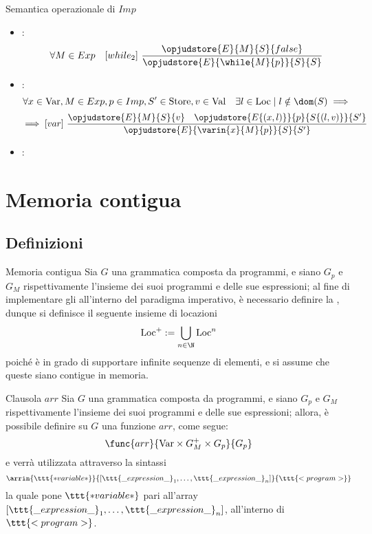 \documentclass[a4paper, 12pt]{report}
\begin{document}
\begin{framedprop}[label={imp sem},breakable]{Semantica operazionale di $Imp$}
\begin{itemize}
            \item {}:  $$\forall M \in Exp \quad [while_2] \ \dfrac{\opjudstore{E}{M}{S}{false}}{\opjudstore{E}{\while{M}{p}}{S}{S}}$$
            \item {}: $$\forall x \in \mathrm{Var}, M \in Exp, p \in Imp, S' \in \mathrm{Store}, v \in \mathrm{Val} \quad \exists l \in \mathrm{Loc} \mid l \notin \dom(S) \implies$$ $$\implies [var] \ \dfrac{\opjudstore{E}{M}{S}{v} \quad \opjudstore{E\{(x,l)\}}{p}{S\{(l,v)\}}{S'}}{\opjudstore{E}{\varin{x}{M}{p}}{S}{S'}}$$
            \item {}: 
        \end{itemize}
    \end{framedprop}

    \section{Memoria contigua}

    \subsection{Definizioni}

    \begin{frameddefn}{Memoria contigua}
        Sia $G$ una grammatica composta da programmi, e siano $G_p$ e $G_M$ rispettivamente l'insieme dei suoi programmi e delle sue espressioni; al fine di implementare gli  all'interno del paradigma imperativo, è necessario definire la , dunque si definisce il seguente insieme di locazioni $$\displaystyle \mathrm{Loc}^+ := \bigcup_{n \in \N}{\mathrm{Loc}^n}$$ poiché è in grado di supportare infinite sequenze di elementi, e si assume che queste siano contigue in memoria.
    \end{frameddefn}

    \begin{frameddefn}{Clausola $arr$}
        Sia $G$ una grammatica composta da programmi, e siano $G_p$ e $G_M$ rispettivamente l'insieme dei suoi programmi e delle sue espressioni; allora, è possibile definire su $G$ una funzione $arr$, come segue: $$\func{arr}{\mathrm{Var} \times G_M^+ \times G_p}{G_p}$$ e verrà utilizzata attraverso la sintassi $$\arrin{\ttt{*variable*}}{[\ttt{\_expression\_}_1, \ldots, \ttt{\_expression\_}_n]}{\ttt{<program>}}$$ la quale pone $\ttt{*variable*}$ pari all'array $[\ttt{\_expression\_}_1, \ldots, \ttt{\_expression\_}_n]$, all'interno di $\ttt{<program>}$.
    \end{frameddefn}
\end{document}
